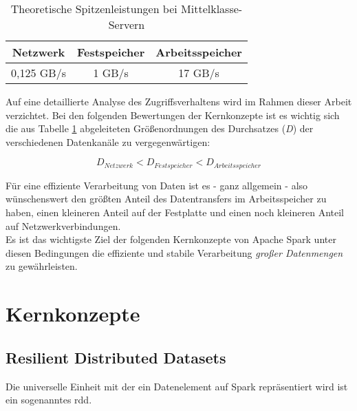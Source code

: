 \begin{table}[ht]
	\centering %
	\begin{tabular}{c c c} %
		\hline\hline %
		Netzwerk & Festspeicher & Arbeitsspeicher\\ [0.5ex] %
		\hline %
		0,125 GB/s & 1 GB/s & 17 GB/s \\ %
		\hline %
	\end{tabular}
	\caption{Theoretische Spitzenleistungen bei Mittelklasse-Servern} %
	\label{table:vgldurchsatz} %
\end{table}

Auf eine detaillierte Analyse des Zugriffsverhaltens wird im Rahmen dieser Arbeit verzichtet. Bei den folgenden Bewertungen der Kernkonzepte ist es wichtig sich die aus Tabelle \ref{table:vgldurchsatz} abgeleiteten Größenordnungen des Durchsatzes (\textit{D}) der verschiedenen Datenkanäle zu vergegenwärtigen:

\begin{equation*}
	D_{Netzwerk} < D_{Festspeicher} < D_{Arbeitsspeicher}
\end{equation*}

Für eine effiziente Verarbeitung von Daten ist es - ganz allgemein - also wünschenswert den größten Anteil des Datentransfers im Arbeitsspeicher zu haben, einen kleineren Anteil auf der Festplatte und einen noch kleineren Anteil auf Netzwerkverbindungen.\\

Es ist das wichtigste Ziel der folgenden Kernkonzepte von Apache Spark unter diesen Bedingungen die effiziente und stabile Verarbeitung \textit{großer Datenmengen}\cite{Sam14} zu gewährleisten.\\

\section{Kernkonzepte}

\subsection{Resilient Distributed Datasets}
Die universelle Einheit mit der ein Datenelement auf Spark repräsentiert wird ist ein sogenanntes \gls{rdd}\cite{Mat12}.\\

